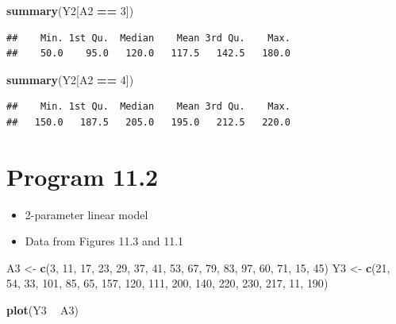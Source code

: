 \documentclass[
  10pt,
]{book}
\newenvironment{Shaded}{\begin{snugshade}}{\end{snugshade}}
\newcommand{\DecValTok}[1]{\textcolor[rgb]{0.00,0.00,0.81}{#1}}
\newcommand{\KeywordTok}[1]{\textcolor[rgb]{0.13,0.29,0.53}{\textbf{#1}}}
\newcommand{\NormalTok}[1]{#1}
\newcommand{\OperatorTok}[1]{\textcolor[rgb]{0.81,0.36,0.00}{\textbf{#1}}}
\newcommand{\StringTok}[1]{\textcolor[rgb]{0.31,0.60,0.02}{#1}}
\providecommand{\tightlist}{%
  \setlength{\itemsep}{0pt}\setlength{\parskip}{0pt}}
\begin{document}
\begin{Shaded}
\begin{Highlighting}[]
\KeywordTok{summary}\NormalTok{(Y2[A2 }\OperatorTok{==}\StringTok{ }\DecValTok{3}\NormalTok{])}
\end{Highlighting}
\end{Shaded}

\begin{verbatim}
##    Min. 1st Qu.  Median    Mean 3rd Qu.    Max. 
##    50.0    95.0   120.0   117.5   142.5   180.0
\end{verbatim}

\begin{Shaded}
\begin{Highlighting}[]
\KeywordTok{summary}\NormalTok{(Y2[A2 }\OperatorTok{==}\StringTok{ }\DecValTok{4}\NormalTok{])}
\end{Highlighting}
\end{Shaded}

\begin{verbatim}
##    Min. 1st Qu.  Median    Mean 3rd Qu.    Max. 
##   150.0   187.5   205.0   195.0   212.5   220.0
\end{verbatim}

\hypertarget{program-11.2}{%
\section{Program 11.2}\label{program-11.2}}

\begin{itemize}
\tightlist
\item
  2-parameter linear model
\item
  Data from Figures 11.3 and 11.1
\end{itemize}

\begin{Shaded}
\begin{Highlighting}[]
\NormalTok{A3 <-}
\StringTok{  }\KeywordTok{c}\NormalTok{(}\DecValTok{3}\NormalTok{, }\DecValTok{11}\NormalTok{, }\DecValTok{17}\NormalTok{, }\DecValTok{23}\NormalTok{, }\DecValTok{29}\NormalTok{, }\DecValTok{37}\NormalTok{, }\DecValTok{41}\NormalTok{, }\DecValTok{53}\NormalTok{, }\DecValTok{67}\NormalTok{, }\DecValTok{79}\NormalTok{, }\DecValTok{83}\NormalTok{, }\DecValTok{97}\NormalTok{, }\DecValTok{60}\NormalTok{, }\DecValTok{71}\NormalTok{, }\DecValTok{15}\NormalTok{, }\DecValTok{45}\NormalTok{)}
\NormalTok{Y3 <-}
\StringTok{  }\KeywordTok{c}\NormalTok{(}\DecValTok{21}\NormalTok{, }\DecValTok{54}\NormalTok{, }\DecValTok{33}\NormalTok{, }\DecValTok{101}\NormalTok{, }\DecValTok{85}\NormalTok{, }\DecValTok{65}\NormalTok{, }\DecValTok{157}\NormalTok{, }\DecValTok{120}\NormalTok{, }\DecValTok{111}\NormalTok{, }\DecValTok{200}\NormalTok{, }\DecValTok{140}\NormalTok{, }\DecValTok{220}\NormalTok{, }\DecValTok{230}\NormalTok{, }\DecValTok{217}\NormalTok{,}
    \DecValTok{11}\NormalTok{, }\DecValTok{190}\NormalTok{)}

\KeywordTok{plot}\NormalTok{(Y3 }\OperatorTok{~}\StringTok{ }\NormalTok{A3)}
\end{Highlighting}
\end{Shaded}
\end{document}
